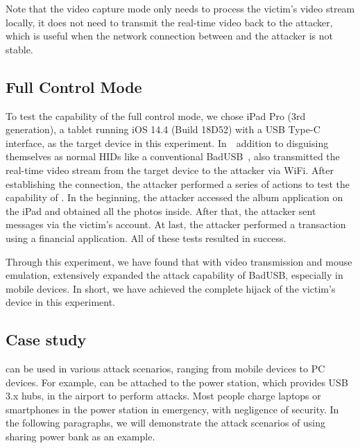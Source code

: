 Note that the video capture mode only needs to
process the victim's video stream locally, it does not need to transmit the real-time video back to the attacker, which is useful when the network connection between \tool and the attacker is not stable.

\subsection{Full Control Mode}

To test the capability of the full control mode, we chose iPad Pro (3rd generation),
a tablet running iOS 14.4 (Build 18D52) with a \ac{USB} Type-C interface,
as the target device in this experiment.
In　addition to disguising themselves as normal \acp{HID} like a conventional BadUSB~\cite{badusb}, \tool also transmitted the real-time video stream from the target device to the attacker via WiFi.
After establishing the connection, the attacker performed a series of actions to test the capability of \tool.
In the beginning, the attacker accessed the album application on the iPad and obtained all the photos inside.
After that, the attacker sent messages via the victim's account. At last, the attacker performed a transaction using a financial application.
All of these tests resulted in success.

Through this experiment, we have found that with video transmission and mouse
emulation, \tool extensively expanded the attack capability of BadUSB,
especially in mobile devices. In short, we have achieved the complete hijack of the victim's
device in this experiment.

\subsection{Case study}
\label{subsec:case_study}
\tool can be used in various attack scenarios, ranging from mobile devices to PC devices.
For example, \tool can be attached to the power station, which provides USB 3.x hubs, in the airport to perform attacks.
Most people charge laptops or smartphones in the power station in emergency, with negligence of security.
In the following paragraphs, we will demonstrate the attack scenarios of \tool using sharing power bank as an example.


